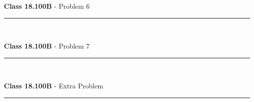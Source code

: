 \documentclass[11pt,reqno]{article}
\begin{document}
\vspace{15pt}
\begin{flushleft} 
\textbf{Class 18.100B} - Problem 6\\
\rule{500pt}{1pt}\\
\end{flushleft} 

\vspace{15pt}
\begin{flushleft} 
\textbf{Class 18.100B} - Problem 7\\
\rule{500pt}{1pt}\\
\end{flushleft} 

\vspace{15pt}
\begin{flushleft} 
\textbf{Class 18.100B} - Extra Problem \\
\rule{500pt}{1pt}\\
\end{flushleft} 
\end{document}
